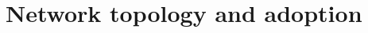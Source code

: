 \documentclass[12pt]{article}
\begin{document}
\section{Network topology and adoption}

%
\end{document}
